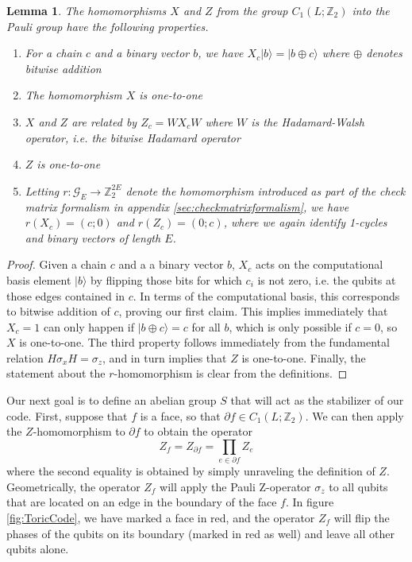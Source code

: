 \documentclass[a4paper, draft]{article}
\theoremstyle{own}
\newtheorem{lem}[thm]{Lemma}
\theoremstyle{remark}
\newcommand{\Z}{\mathbb{Z}}
\begin{document}
\begin{lem}
The homomorphisms $X$ and $Z$ from the group $C_1(L;\Z_2)$ into the Pauli group have the following properties.
\begin{enumerate}
	\item For a chain $c$ and a binary vector $b$, we have $X_c|b \rangle = |b \oplus c \rangle$ where $\oplus$ denotes bitwise addition
	\item The homomorphism $X$ is one-to-one
	\item $X$ and $Z$ are related by $Z_c = W X_c W$ where $W$ is the Hadamard-Walsh operator, i.e. the bitwise Hadamard operator
	\item $Z$ is one-to-one
	\item Letting $r \colon \mathcal{G}_E \rightarrow \Z_2^{2E}$ denote the homomorphism introduced as part of the check matrix formalism in appendix \ref{sec:checkmatrixformalism}, we have $r(X_c) = (c ; 0)$ and $r(Z_c) = (0 ; c)$, where we again identify 1-cycles and binary vectors of length $E$.
\end{enumerate}
\end{lem}

\begin{proof}
Given a chain $c$ and a a binary vector $b$, $X_c$ acts on the computational basis element $|b \rangle$ by flipping those bits for which $c_i$ is not zero, i.e. the qubits at those edges contained in $c$. In terms of the computational basis, this corresponds to bitwise addition of $c$, proving our first claim. This implies immediately that $X_c = 1$ can only happen if $| b \oplus c \rangle  = c$ for all $b$, which is only possible if $c=0$, so $X$ is one-to-one. The third property follows immediately from the fundamental relation $H \sigma_x H = \sigma_z$, and in turn implies that $Z$ is one-to-one. Finally, the statement about the $r$-homomorphism is clear from the definitions.
\end{proof}

Our next goal is to define an abelian group $S$ that will act as the stabilizer of our code. First, suppose that $f$ is a face, so that $\partial f \in C_1(L;\Z_2)$. We can then apply the $Z$-homomorphism to $\partial f$ to obtain the operator 
$$
Z_f = Z_{\partial f} = \prod_{e \in \partial f} Z_e
$$
where the second equality is obtained by simply unraveling the definition of $Z$. Geometrically, the operator $Z_f$ will apply the Pauli Z-operator $\sigma_z$ to all qubits that are located on an edge in the boundary of the face $f$. In figure \ref{fig:ToricCode}, we have marked a face in red, and the operator $Z_f$ will flip the phases of the qubits on its boundary (marked in red as well) and leave all other qubits alone.
\end{document}
